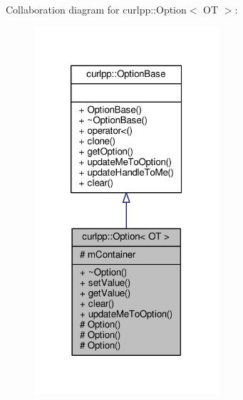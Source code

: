 Collaboration diagram for curlpp\-:\-:Option$<$ O\-T $>$\-:
\nopagebreak
\begin{figure}[H]
\begin{center}
\leavevmode
\includegraphics[width=194pt]{classcurlpp_1_1Option__coll__graph}
\end{center}
\end{figure}
